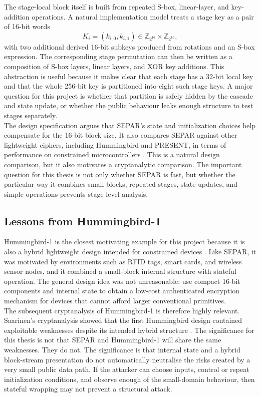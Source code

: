 \documentclass[11pt]{article}
\newcommand{\Z}[1]{\mathbb{Z}_{#1}}
\begin{document}
The stage-local block itself is built from repeated S-box, linear-layer, and key-addition operations. A natural implementation model treats a stage key as a pair of 16-bit words
\[
K_i=(k_{i,0},k_{i,1})\in \Z{2^{16}}\times\Z{2^{16}},
\]
with two additional derived 16-bit subkeys produced from rotations and an S-box expression. The corresponding stage permutation can then be written as a composition of S-box layers, linear layers, and XOR key additions. This abstraction is useful because it makes clear that each stage has a 32-bit local key and that the whole 256-bit key is partitioned into eight such stage keys. A major question for this project is whether that partition is safely hidden by the cascade and state update, or whether the public behaviour leaks enough structure to test stages separately.\\

The design specification argues that SEPAR's state and initialization choices help compensate for the 16-bit block size. It also compares SEPAR against other lightweight ciphers, including Hummingbird and PRESENT, in terms of performance on constrained microcontrollers \cite{VahiJassbi2020}. This is a natural design comparison, but it also motivates a cryptanalytic comparison. The important question for this thesis is not only whether SEPAR is fast, but whether the particular way it combines small blocks, repeated stages, state updates, and simple operations prevents stage-level analysis.

\subsection{Lessons from Hummingbird-1}

Hummingbird-1 is the closest motivating example for this project because it is also a hybrid lightweight design intended for constrained devices \cite{Engels2010}. Like SEPAR, it was motivated by environments such as RFID tags, smart cards, and wireless sensor nodes, and it combined a small-block internal structure with stateful operation. The general design idea was not unreasonable: use compact 16-bit components and internal state to obtain a low-cost authenticated encryption mechanism for devices that cannot afford larger conventional primitives.\\

The subsequent cryptanalysis of Hummingbird-1 is therefore highly relevant. Saarinen's cryptanalysis showed that the first Hummingbird design contained exploitable weaknesses despite its intended hybrid structure \cite{Saarinen2011}. The significance for this thesis is not that SEPAR and Hummingbird-1 will share the same weaknesses. They do not. The significance is that internal state and a hybrid block-stream presentation do not automatically neutralise the risks created by a very small public data path. If the attacker can choose inputs, control or repeat initialization conditions, and observe enough of the small-domain behaviour, then stateful wrapping may not prevent a structural attack.\\
\end{document}
